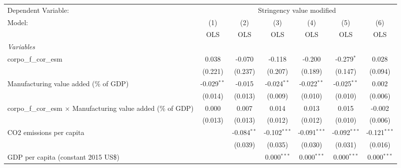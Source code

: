 
\begingroup
\centering
\begin{tabular}{lcccccc}
   \toprule
   Dependent Variable: & \multicolumn{6}{c}{Stringency value modified}\\
   Model:                                                                 & (1)           & (2)           & (3)            & (4)            & (5)            & (6)\\  
                                                                          &  OLS          & OLS           & OLS            & OLS            & OLS            & OLS\\  
   \midrule
   \emph{Variables}\\
   corpo\_f\_cor\_esm                                                     & 0.038         & -0.070        & -0.118         & -0.200         & -0.279$^{*}$   & 0.028\\   
                                                                          & (0.221)       & (0.237)       & (0.207)        & (0.189)        & (0.147)        & (0.094)\\   
   Manufacturing value added (\% of GDP)                                  & -0.029$^{**}$ & -0.015        & -0.024$^{**}$  & -0.022$^{**}$  & -0.025$^{**}$  & 0.002\\   
                                                                          & (0.014)       & (0.013)       & (0.009)        & (0.010)        & (0.010)        & (0.006)\\   
   corpo\_f\_cor\_esm $\times$ Manufacturing value added (\% of GDP)      & 0.000         & 0.007         & 0.014          & 0.013          & 0.015          & -0.002\\   
                                                                          & (0.013)       & (0.013)       & (0.012)        & (0.012)        & (0.010)        & (0.006)\\   
   CO2 emissions per capita                                               &               & -0.084$^{**}$ & -0.102$^{***}$ & -0.091$^{***}$ & -0.092$^{***}$ & -0.121$^{***}$\\   
                                                                          &               & (0.039)       & (0.035)        & (0.030)        & (0.031)        & (0.016)\\   
   GDP per capita (constant 2015 US\$)                                    &               &               & 0.000$^{***}$  & 0.000$^{***}$  & 0.000$^{***}$  & 0.000$^{***}$\\   

\end{tabular}

